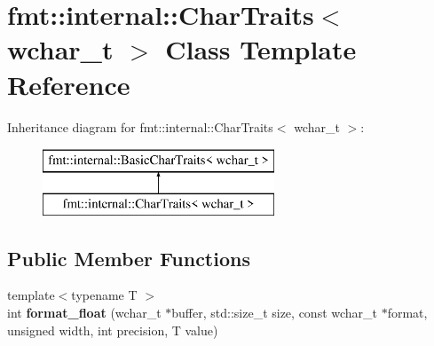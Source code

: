 \hypertarget{classfmt_1_1internal_1_1CharTraits_3_01wchar__t_01_4}{}\section{fmt\+:\+:internal\+:\+:Char\+Traits$<$ wchar\+\_\+t $>$ Class Template Reference}
\label{classfmt_1_1internal_1_1CharTraits_3_01wchar__t_01_4}
Inheritance diagram for fmt\+:\+:internal\+:\+:Char\+Traits$<$ wchar\+\_\+t $>$\+:\begin{figure}[H]
\begin{center}
\leavevmode
\includegraphics[height=2.000000cm]{classfmt_1_1internal_1_1CharTraits_3_01wchar__t_01_4}
\end{center}
\end{figure}
\subsection*{Public Member Functions}
\begin{DoxyCompactItemize}
\item 
{\footnotesize template$<$typename T $>$ }\\int {\bfseries format\+\_\+float} (wchar\+\_\+t $\ast$buffer, std\+::size\+\_\+t size, const wchar\+\_\+t $\ast$format, unsigned width, int precision, T value)\hypertarget{classfmt_1_1internal_1_1CharTraits_3_01wchar__t_01_4_aed134df338cc820d428797528dab4666}{}\label{classfmt_1_1internal_1_1CharTraits_3_01wchar__t_01_4_aed134df338cc820d428797528dab4666}

\end{DoxyCompactItemize}
